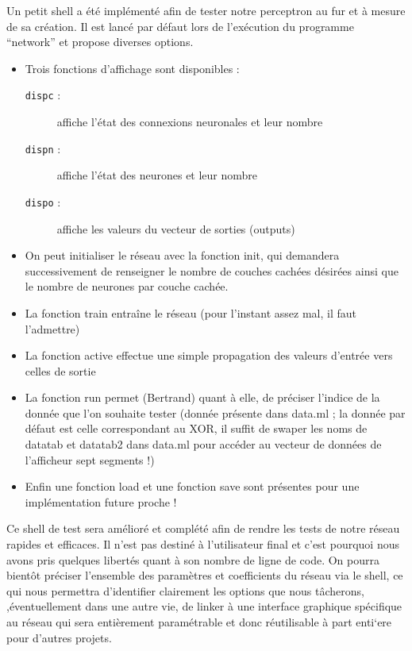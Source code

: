 \documentclass[a4paper,10pt]{report}
\begin{document}
Un petit shell a \'et\'e impl\'ement\'e afin de tester notre perceptron
au fur et \`a mesure de sa cr\'eation. Il est lanc\'e par d\'efaut lors
de l'ex\'ecution du programme ``network'' et propose diverses
options. 
\begin{itemize}
	\item Trois fonctions d'affichage sont disponibles : 
\begin{description}
	\item[\verb!dispc! :] affiche l'\'etat des connexions neuronales et leur nombre
	\item[\verb!dispn! :] affiche l'\'etat des neurones et leur nombre
	\item[\verb!dispo! :] affiche les valeurs du vecteur de sorties (outputs)
\end{description}

\item On peut initialiser le r\'eseau avec la fonction init, qui demandera
successivement de renseigner le nombre de couches cach\'ees d\'esir\'ees
ainsi que le nombre de neurones par couche cach\'ee.

\item La fonction train entra\^ine le r\'eseau (pour l'instant assez mal, il
faut l'admettre) 

\item La fonction active effectue une simple propagation des valeurs
d'entr\'ee vers celles de sortie

\item La fonction run permet (Bertrand) quant \`a elle, de pr\'eciser l'indice de la donn\'ee
que l'on souhaite tester (donn\'ee pr\'esente dans data.ml ; la donn\'ee
par d\'efaut est celle correspondant au XOR, il suffit de swaper les
noms de datatab et datatab2 dans data.ml pour acc\'eder au vecteur de
donn\'ees de l'afficheur sept segments !)

\item Enfin une fonction load et une fonction save sont pr\'esentes pour une
impl\'ementation future proche !

\end{itemize}


Ce shell de test sera am\'elior\'e et compl\'et\'e afin de rendre les
tests de notre r\'eseau rapides et efficaces. Il n'est pas destin\'e \`a
l'utilisateur final et c'est pourquoi nous avons pris quelques
libert\'es quant \`a son nombre de ligne de code.
On pourra bient\^ot pr\'eciser l'ensemble des param\`etres et
coefficients du r\'eseau via le shell, ce qui nous permettra
d'identifier clairement les options que nous t\^acherons,
,\'eventuellement dans une autre vie, de linker \`a une interface graphique
sp\'ecifique au r\'eseau qui sera enti\`erement param\'etrable et donc
r\'eutilisable \`a part enti`ere pour d'autres projets.
\end{document}
